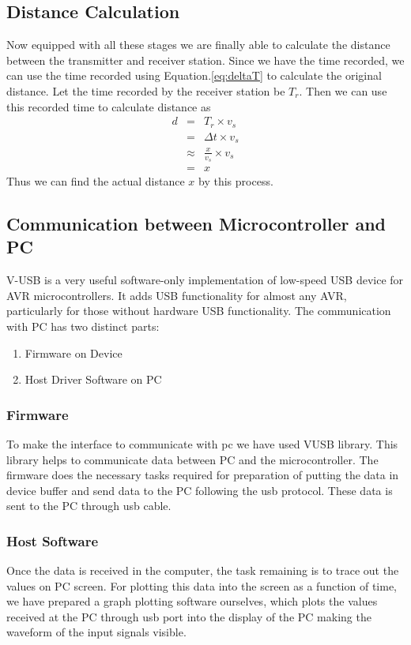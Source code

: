 \subsection{Distance Calculation}
Now equipped with all these stages we are finally able to calculate the distance between the transmitter and receiver station. Since we have the time recorded, we can use the time recorded using Equation.\ref{eq:deltaT} to calculate the original distance. Let the time recorded by the receiver station be $T_r$. Then we can use this recorded time to calculate distance as
\begin{eqnarray*}
	d &=& T_r \times v_s\\
	{}&=&\Delta t \times v_s\\
	{}&\approx&\frac{x}{v_s} \times v_s\\
	{}& = & x
\end{eqnarray*}
Thus we can find the actual distance $x$ by this process.



\subsection{Communication between Microcontroller and PC}
 V-USB is a very useful software-only implementation of low-speed USB device for AVR microcontrollers. It adds USB functionality for almost any AVR, particularly for those without hardware USB functionality. The communication with PC has two distinct parts:
\begin{enumerate}
	\item Firmware on Device
	\item Host Driver Software on PC
\end{enumerate}

\subsubsection{Firmware}
To make the interface to communicate with pc we have used VUSB library. This library helps to communicate data between PC and the microcontroller. The firmware does the necessary tasks required for preparation of putting the data in device buffer and send data to the PC following the \gls{usb} protocol. These data is sent to the PC through \gls{usb} cable.


\subsubsection{Host Software}
Once the data is received in the computer, the task remaining is to trace out the values on PC screen. For plotting this data into the screen as a function of time, we have prepared a graph plotting software ourselves, which plots the values received at the PC through \gls{usb} port into the display of the PC making the waveform of the input signals visible. 

